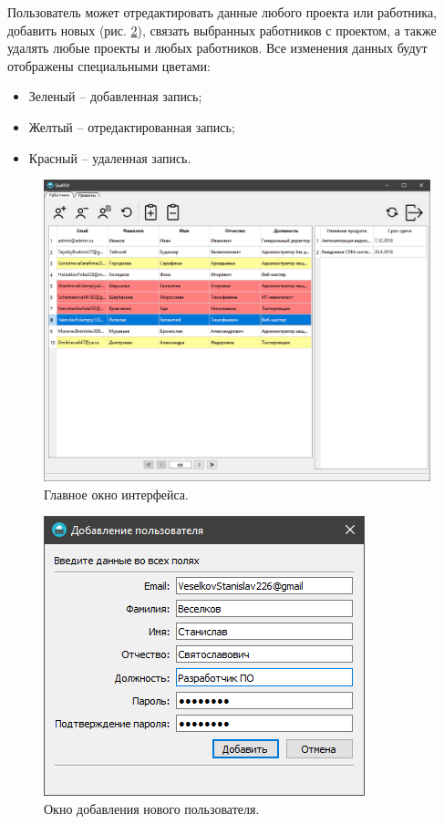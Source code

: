 \documentclass[14pt, a4paper]{extarticle}
\begin{document}
    Пользователь может отредактировать данные любого проекта или работника, добавить новых (рис. \ref{fig:add_user_window_win}), связать выбранных работников с проектом, а также удалять любые проекты и любых работников. Все изменения данных будут отображены специальными цветами:
    \begin{itemize}
        \item Зеленый – добавленная запись;
        \item Желтый – отредактированная запись;
        \item Красный – удаленная запись.
    \end{itemize}

    \begin{figure}[h]
        \centering
        \includegraphics[width=1\linewidth]{img/main_window_win.png}
        \caption{Главное окно интерфейса.}
        \label{fig:main_window_win}
    \end{figure}

    \begin{figure}[h]
        \centering
        \includegraphics[width=0.4\linewidth]{img/add_user_window_win.png}
        \caption{Окно добавления нового пользователя.}
        \label{fig:add_user_window_win}
    \end{figure}
    
\end{document}

